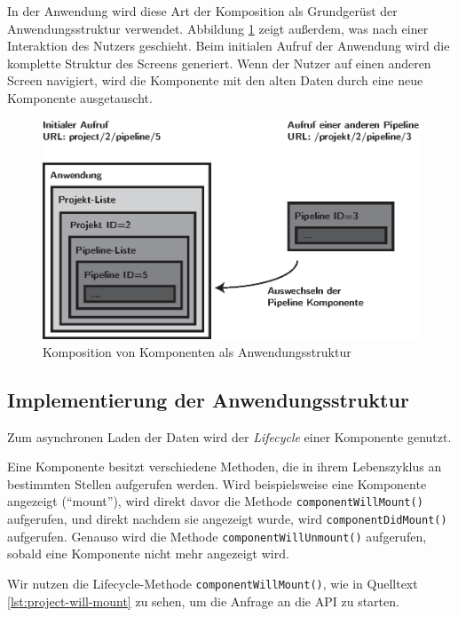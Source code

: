 In der Anwendung wird diese Art der Komposition als Grundgerüst der Anwendungsstruktur verwendet. Abbildung \ref{fig:komposition} zeigt außerdem, was nach einer Interaktion des Nutzers geschieht. Beim initialen Aufruf der Anwendung wird die komplette Struktur des Screens generiert. Wenn der Nutzer auf einen anderen Screen navigiert, wird die Komponente mit den alten Daten durch eine neue Komponente ausgetauscht.

\begin{figure}[h]
  \caption{Komposition von Komponenten als Anwendungsstruktur}
  \label{fig:komposition}
  \centering
    \includegraphics[width=\textwidth]{assets/komposition}
\end{figure}

\subsection{Implementierung der Anwendungsstruktur}
\label{subsec:implementierung-struktur}

Zum asynchronen Laden der Daten wird der \emph{Lifecycle} einer Komponente genutzt.

Eine Komponente besitzt verschiedene Methoden, die in ihrem Lebenszyklus an bestimmten Stellen aufgerufen werden. Wird beispielsweise eine Komponente angezeigt (``mount''), wird direkt davor die Methode \texttt{componentWillMount()} aufgerufen, und direkt nachdem sie angezeigt wurde, wird \texttt{componentDidMount()} aufgerufen. Genauso wird die Methode \texttt{componentWillUnmount()} aufgerufen, sobald eine Komponente nicht mehr angezeigt wird.

Wir nutzen die Lifecycle-Methode \texttt{componentWillMount()}, wie in Quelltext \ref{lst:project-will-mount} zu sehen, um die Anfrage an die API zu starten.

